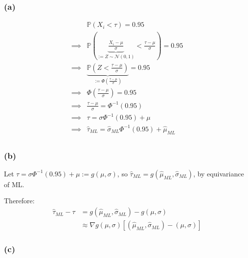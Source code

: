 \documentclass{article}
\renewcommand{\P}{\mathbb{P}}
\begin{document}
\subsubsection{(a)}
\begin{align*}
             & \P \left( X_i < \tau \right) = 0.95                                                                         \\
    \implies &
    \P \left( \underbrace{\frac{X_i - \mu}{\sigma}}_{:=Z \sim \mathcal{N}(0,1)} < \frac{\tau - \mu}{\sigma} \right) = 0.95 \\
    \implies &
    \underbrace{\P \left( Z < \frac{\tau - \mu}{\sigma} \right)}_{:= \Phi (\frac{\tau - \mu}{\sigma})} = 0.95              \\
    \implies &
    \Phi \left(\frac{\tau - \mu}{\sigma}\right) = 0.95                                                                     \\
    \implies &
    \frac{\tau - \mu}{\sigma} = \Phi^{-1}\left(0.95\right)                                                                 \\
    \implies &
    \tau = \sigma \Phi^{-1}\left(0.95\right) + \mu                                                                         \\
    \implies &
    \hat \tau_{ML} = \hat\sigma_{ML} \Phi^{-1}\left(0.95\right) + \hat\mu_{ML}                                             \\
\end{align*}

\subsubsection{(b)}
Let \(\tau = \sigma \Phi^{-1}\left(0.95\right) + \mu := g(\mu, \sigma)\), so \(\hat\tau_{ML} = g(\hat\mu_{ML}, \hat\sigma_{ML})\), by equivariance of ML.

Therefore:
\begin{align*}
    \hat\tau_{ML} - \tau
     & = g(\hat\mu_{ML}, \hat\sigma_{ML}) - g(\mu, \sigma)                                          \\
     & \approx \nabla g(\mu, \sigma) \left[ (\hat\mu_{ML}, \hat\sigma_{ML}) - (\mu, \sigma) \right]
\end{align*}

\subsubsection{(c)}
\end{document}
